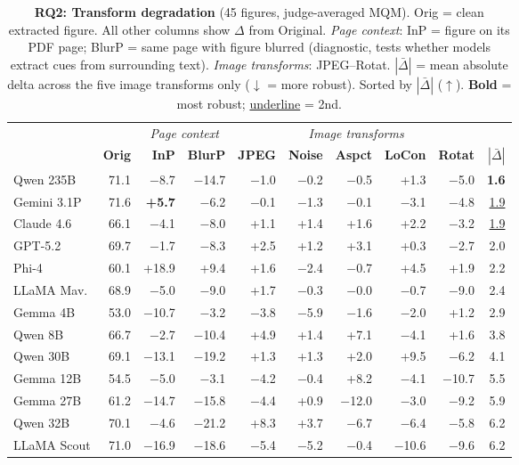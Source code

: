 \begin{table}[!ht]
\centering
\scriptsize
\setlength{\tabcolsep}{2.5pt}
\caption{\textbf{RQ2: Transform degradation} (45 figures, judge-averaged MQM).
  Orig = clean extracted figure. All other columns show $\Delta$ from Original.
  \emph{Page context}: InP = figure on its PDF page; BlurP = same page with figure blurred (diagnostic, tests whether models extract cues from surrounding text).
  \emph{Image transforms}: JPEG--Rotat.
  $|\bar{\Delta}|$ = mean absolute delta across the five image transforms only ($\downarrow$ = more robust).
  Sorted by $|\bar{\Delta}|$ ($\uparrow$). \textbf{Bold} = most robust; \underline{underline} = 2nd.
}\label{tab:degradation}
\begin{tabular}{@{}l r rr rrrrr r@{}}
\toprule
 & & \multicolumn{2}{c}{\textit{Page context}} & \multicolumn{5}{c}{\textit{Image transforms}} & \\
\cmidrule(lr){3-4}\cmidrule(lr){5-9}
 & \textbf{Orig} & \textbf{InP} & \cellcolor{gray!8}\textbf{BlurP} & \textbf{JPEG} & \textbf{Noise} & \textbf{Aspct} & \textbf{LoCon} & \textbf{Rotat} & $|\bar{\Delta}|$ \\
\midrule
Qwen 235B      & 71.1 & $-$8.7 & \cellcolor{gray!8}$-$14.7 & $-$1.0 & $-$0.2 & $-$0.5 & +1.3 & $-$5.0 & \textbf{1.6} \\
Gemini 3.1P    & 71.6 & \textbf{+5.7} & \cellcolor{gray!8}$-$6.2 & $-$0.1 & $-$1.3 & $-$0.1 & $-$3.1 & $-$4.8 & \underline{1.9} \\
Claude 4.6     & 66.1 & $-$4.1 & \cellcolor{gray!8}$-$8.0 & +1.1 & +1.4 & +1.6 & +2.2 & $-$3.2 & \underline{1.9} \\
GPT-5.2        & 69.7 & $-$1.7 & \cellcolor{gray!8}$-$8.3 & +2.5 & +1.2 & +3.1 & +0.3 & $-$2.7 & 2.0 \\
Phi-4          & 60.1 & +18.9 & \cellcolor{gray!8}+9.4 & +1.6 & $-$2.4 & $-$0.7 & +4.5 & +1.9 & 2.2 \\
LLaMA Mav.     & 68.9 & $-$5.0 & \cellcolor{gray!8}$-$9.0 & +1.7 & $-$0.3 & $-$0.0 & $-$0.7 & $-$9.0 & 2.4 \\
Gemma 4B       & 53.0 & $-$10.7 & \cellcolor{gray!8}$-$3.2 & $-$3.8 & $-$5.9 & $-$1.6 & $-$2.0 & +1.2 & 2.9 \\
Qwen 8B        & 66.7 & $-$2.7 & \cellcolor{gray!8}$-$10.4 & +4.9 & +1.4 & +7.1 & $-$4.1 & +1.6 & 3.8 \\
Qwen 30B       & 69.1 & $-$13.1 & \cellcolor{gray!8}$-$19.2 & +1.3 & +1.3 & +2.0 & +9.5 & $-$6.2 & 4.1 \\
Gemma 12B      & 54.5 & $-$5.0 & \cellcolor{gray!8}$-$3.1 & $-$4.2 & $-$0.4 & +8.2 & $-$4.1 & $-$10.7 & 5.5 \\
Gemma 27B      & 61.2 & $-$14.7 & \cellcolor{gray!8}$-$15.8 & $-$4.4 & +0.9 & $-$12.0 & $-$3.0 & $-$9.2 & 5.9 \\
Qwen 32B       & 70.1 & $-$4.6 & \cellcolor{gray!8}$-$21.2 & +8.3 & +3.7 & $-$6.7 & $-$6.4 & $-$5.8 & 6.2 \\
LLaMA Scout    & 71.0 & $-$16.9 & \cellcolor{gray!8}$-$18.6 & $-$5.4 & $-$5.2 & $-$0.4 & $-$10.6 & $-$9.6 & 6.2 \\
\bottomrule
\end{tabular}
\end{table}

